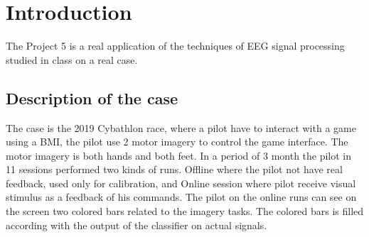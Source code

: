 \section{Introduction}\label{sec:introduction} 
The Project 5 is a real application of the techniques of EEG signal processing studied in class on a real case. 
\subsection{Description of the case}\label{subsec:desc}
The case is the 2019 Cybathlon race, where a pilot have to interact with a game using a BMI, the pilot use 2 motor imagery to control the game interface. The motor imagery is both hands and both feet. In a period of 3 month the pilot in 11 sessions performed two kinds of runs. Offline where the pilot not have real feedback, used only for calibration, and Online session where pilot receive visual stimulus as a feedback of his commands. The pilot on the online runs can see on the screen two colored bars related to the imagery tasks. The colored bars is filled according with the output of the classifier on actual signals.
